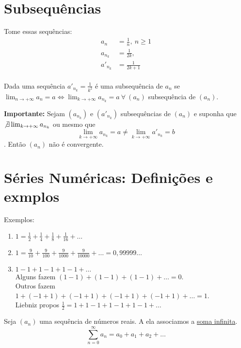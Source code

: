 \documentclass[12pt,openany]{book}
\begin{document}
\section{Subsequências}
\label{sec:s24}
\hspace{5mm} Tome essas sequências:
\begin{align*}
a_n &= \frac{1}{n}, \ n \geq 1 \\
a_{n_k} &= \frac{1}{2k}, \\
a'_{n_k} &= \frac{1}{2k+1} \\
\end{align*}

Dada uma sequência $\displaystyle{a'_{n_k} = \frac{1}{k^2}}$ é uma subsequência de $a_n$ se $\displaystyle{\lim_{n \rightarrow +\infty} a_n = a \Longleftrightarrow \lim_{k \rightarrow +\infty} a_{n_k} = a} \ \forall \ (a_n)$ subsequência de $(a_n)$.

\textbf{Importante: }Sejam $(a_{n_k})$ e $(a'_{n_k})$ subsequências de $(a_n)$ e suponha que $\not \exists \lim_{k \rightarrow +\infty} a_{n_k}$ ou mesmo que $$\lim_{k \rightarrow +\infty} a_{n_k} = a \neq \lim_{k \rightarrow +\infty} a'_{n_k} = b $$. Então $(a_n)$ não é convergente.

\section{Séries Numéricas: Definições e exmplos}
\label{sec:s25}
\hspace{5mm} Exemplos:
\begin{enumerate}
\item $\displaystyle{1 = \frac{1}{2} + \frac{1}{4} + \frac{1}{8} + \frac{1}{16} + \hdots}$ \label{ex:251}
\item $\displaystyle{1 = \frac{9}{10} + \frac{9}{100} + \frac{9}{1000} + \frac{9}{10000} + \hdots = 0,99999 \hdots} $ \label{ex:252}
\item $\displaystyle{1 -1 + 1 - 1 + 1 - 1 + \hdots} $ \label{ex:253} \\
Alguns fazem $(1-1) + (1-1) + (1-1) + \hdots = 0$. \\ Outros fazem $1 + (-1 + 1) + (-1 + 1) + (-1 + 1) + (-1 + 1) + \hdots = 1$. \\ Liebniz propos $\frac{1}{2} = 1 + 1 - 1 + 1 - 1 + 1 - 1 + \hdots$ \\
\end{enumerate}

Seja $(a_n)$ uma sequência  de números reais. A ela associamos a \underline{soma infinita}. $$\sum_{n = 0}^{\infty} a_n = a_0 + a_1 + a_2 + \hdots$$
\end{document}

